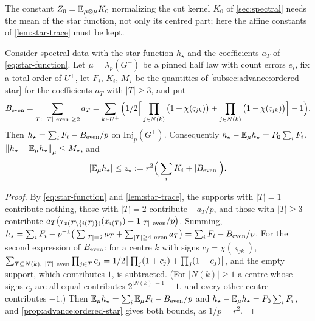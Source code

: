 The constant $Z_0=\E_{\mu\otimes\mu}K_0$ normalizing the cut kernel $K_0$ of \cref{sec:spectral} needs the mean of the star function, not only
its centred part; here the affine constants of \cref{lem:star-trace} must be
kept.

\begin{lemma}\label{lem:star-mean}
Consider spectral data with the star function $h_\star$ and the coefficients
$a_T$ of \eqref{eq:star-function}. Let $\mu=\lambda_p(G^+)$ be a pinned half law
with count errors $e_i$, fix a total order of $U^+$, let $F_i$, $K_i$, $M_\star$
be the quantities of \cref{subsec:advance:ordered-star} for the coefficients
$a_T$ with $|T|\ge3$, and put
\[
  B_{\rm even}=\sum_{T:\ |T|\ \text{even}\ \ge2}a_T
  =\sum_{k\in U^+}\Big(\frac12\Big[\prod_{j\in N(k)}\big(1+\chi(\varsigma_{jk})\big)
  +\prod_{j\in N(k)}\big(1-\chi(\varsigma_{jk})\big)\Big]-1\Big).
\]
Then $h_\star=\sum_iF_i-B_{\rm even}/p$ on $\mathrm{Inj}_p(G^+)$. Consequently
$h_\star-\E_\mu h_\star=P_0\sum_iF_i$, $\norm{h_\star-\E_\mu h_\star}_\mu\le M_\star$,
and
\[
  |\E_\mu h_\star|\le z_\star:=r^2\Big(\sum_iK_i+|B_{\rm even}|\Big).
\]
\end{lemma}

\begin{proof}
By \eqref{eq:star-function} and \cref{lem:star-trace}, the supports with $|T|=1$
contribute nothing, those with $|T|=2$ contribute $-a_T/p$, and those with
$|T|\ge3$ contribute $a_T\big(\tau_{x(T\setminus\{i(T)\})}(x_{i(T)})-\one_{|T|\ \rm
even}/p\big)$. Summing, $h_\star=\sum_iF_i-p^{-1}\big(\sum_{|T|=2}a_T
+\sum_{|T|\ge4\ \rm even}a_T\big)=\sum_iF_i-B_{\rm even}/p$. For the second
expression of $B_{\rm even}$: for a centre $k$ with signs
$c_j=\chi(\varsigma_{jk})$, $\sum_{T\subseteq N(k),\ |T|\ \rm even}\prod_{j\in T}c_j
=\frac12\big[\prod_j(1+c_j)+\prod_j(1-c_j)\big]$, and the empty support, which
contributes $1$, is subtracted. (For $|N(k)|\ge1$ a centre whose signs $c_j$ are
all equal contributes $2^{|N(k)|-1}-1$, and every other centre contributes
$-1$.) Then $\E_\mu h_\star=\sum_i\E_\mu F_i-B_{\rm even}/p$ and
$h_\star-\E_\mu h_\star=P_0\sum_iF_i$, and \cref{prop:advance:ordered-star} gives
both bounds, as $1/p=r^2$.
\end{proof}

